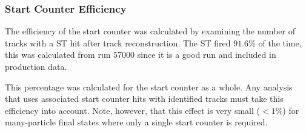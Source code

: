\subsubsection{\label{sec:calib.st.eff}Start Counter Efficiency}

The efficiency of the start counter was calculated by examining the number of tracks with a ST hit after track reconstruction. The ST fired $91.6\%$ of the time, this was calculated from run 57000 since it is a good run and included in production data. \begin{v2}This percentage was calculated for the start counter as a whole. Any analysis that uses associated start counter hits with identified tracks must take this efficiency into account. Note, however, that this effect is very small ($< 1 \%$) for many-particle final states where only a single start counter is required.\end{v2}

\FloatBarrier

